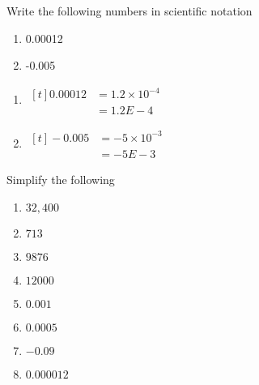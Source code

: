 \begin{myexample}
Write the following numbers in scientific notation
\begin{multicols}{2}
	\begin{enumerate}
		\item 0.00012
		\item -0.005
	\end{enumerate} 
\end{multicols}
\end{myexample}
\begin{myProof}
	\begin{enumerate}
		\item
          $\begin{aligned}[t]
			0.00012 & =  1.2\times 10^{-4} \\
			        & =  1.2 E -4          
                  \end{aligned}$
		\item
          $\begin{aligned}[t]
			-0.005 & =  -5 \times 10^{-3} \\
			       & =  -5E-3             
                 \end{aligned}$
	\end{enumerate} 
	{}
\end{myProof} 

\begin{myexample}
Simplify the following
\drillandskill
\end{myexample}

\begin{multicols}{2}
	\begin{enumerate}
		\item $32,400$
		\item $713$
		\item $9876$
		\item $12000$
		\item $0.001$
		\item $0.0005$
		\item $-0.09$
		\item $0.000012$
	\end{enumerate}
\end{multicols}

